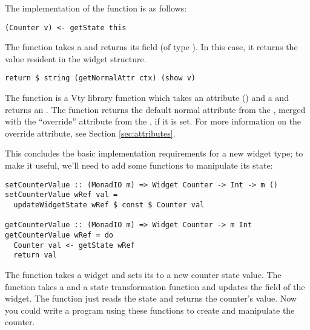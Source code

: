 The implementation of the  function is as follows:

\begin{verbatim}
(Counter v) <- getState this
\end{verbatim}

The  function takes a  and returns its
 field (of type ).  In this case, it returns the
 value resident in the widget structure.

\begin{verbatim}
return $ string (getNormalAttr ctx) (show v)
\end{verbatim}

The  function is a Vty library function which takes an
attribute () and a  and returns an .
The  function returns the default normal attribute
from the , merged with the ``override'' attribute
from the , if it is set.  For more information on
the override attribute, see Section \vref{sec:attributes}.

This concludes the basic implementation requirements for a new widget
type; to make it useful, we'll need to add some functions to
manipulate its state:

\begin{verbatim}
setCounterValue :: (MonadIO m) => Widget Counter -> Int -> m ()
setCounterValue wRef val =
  updateWidgetState wRef $ const $ Counter val

getCounterValue :: (MonadIO m) => Widget Counter -> m Int
getCounterValue wRef = do
  Counter val <- getState wRef
  return val
\end{verbatim}

The  function takes a  widget and sets
its  to a new counter state value.  The
 function takes a  and a state
transformation function and updates the  field of the
widget.  The  function just reads the state and
returns the counter's value.  Now you could write a program using
these functions to create and manipulate the counter.
